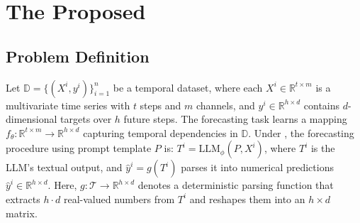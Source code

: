 

\section{The Proposed \Ours}

\subsection{Problem Definition}




Let $\mathbb{D} = \{(X^i,y^i)\}_{i=1}^n$ be a temporal dataset, where each $X^i \in \mathbb{R}^{t \times m}$ is a multivariate time series with $t$ steps and $m$ channels, and $y^i \in \mathbb{R}^{h \times d}$ contains $d$-dimensional targets over $h$ future steps. The forecasting task learns a mapping $f_\theta: \mathbb{R}^{t \times m} \rightarrow \mathbb{R}^{h \times d}$ capturing temporal dependencies in $\mathbb{D}$. Under \Ours, the forecasting procedure using prompt template $P$ is: $T^i = \text{LLM}_\phi(P, X^i)$, where $T^i$ is the LLM's textual output, and $\hat{y}^i = g(T^i)$ parses it into numerical predictions $\hat{y}^i \in \mathbb{R}^{h \times d}$. Here, $g: \mathcal{T}\rightarrow \mathbb{R}^{h \times d}$ denotes a deterministic parsing function that extracts $h\!\cdot\! d$ real-valued numbers from $T^i$ and reshapes them into an $h \times d$ matrix.


